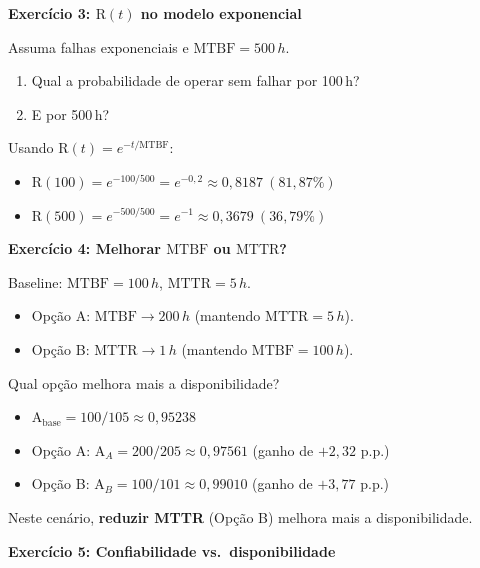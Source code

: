 \documentclass[10pt,a4paper]{article}
\newcommand{\R}{\mathrm{R}}
\newcommand{\A}{\mathrm{A}}
\newcommand{\MTBF}{\mathrm{MTBF}}
\newcommand{\MTTR}{\mathrm{MTTR}}
\begin{document}
\vspace{4pt}

\textbf{Exercício 3: \(\R(t)\) no modelo exponencial}

Assuma falhas exponenciais e \(\MTBF=500\,h\).
\begin{enumerate}
  \item Qual a probabilidade de operar sem falhar por 100\,h?
  \item E por 500\,h?
\end{enumerate}

\begin{solucao}
Usando \(\R(t) = e^{-t/\MTBF}\):
\begin{itemize}
  \item \(\R(100) = e^{-100/500} = e^{-0{,}2} \approx 0{,}8187\ (81{,}87\%)\)
  \item \(\R(500) = e^{-500/500} = e^{-1} \approx 0{,}3679\ (36{,}79\%)\)
\end{itemize}
\end{solucao}

\vspace{4pt}

\textbf{Exercício 4: Melhorar \(\MTBF\) ou \(\MTTR\)?}

Baseline: \(\MTBF=100\,h\), \(\MTTR=5\,h\).
\begin{itemize}
  \item Opção A: \(\MTBF \to 200\,h\) (mantendo \(\MTTR=5\,h\)).
  \item Opção B: \(\MTTR \to 1\,h\) (mantendo \(\MTBF=100\,h\)).
\end{itemize}
Qual opção melhora mais a disponibilidade?

\begin{solucao}
\begin{itemize}
  \item \(\A_{\text{base}} = 100/105 \approx 0{,}95238\)
  \item Opção A: \(\A_A = 200/205 \approx 0{,}97561\) (ganho de \(+2{,}32\) p.p.)
  \item Opção B: \(\A_B = 100/101 \approx 0{,}99010\) (ganho de \(+3{,}77\) p.p.)
\end{itemize}
Neste cenário, \textbf{reduzir MTTR} (Opção B) melhora mais a disponibilidade.
\end{solucao}

\vspace{4pt}

\textbf{Exercício 5: Confiabilidade vs.\ disponibilidade}
\end{document}
